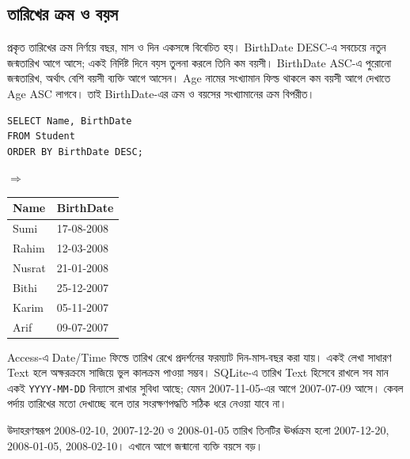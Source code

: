 \subsection{তারিখের ক্রম ও বয়স}
প্রকৃত তারিখের ক্রম নির্ণয়ে বছর, মাস ও দিন একসঙ্গে বিবেচিত হয়। BirthDate DESC-এ সবচেয়ে নতুন জন্মতারিখ আগে আসে; একই নির্দিষ্ট দিনে বয়স তুলনা করলে তিনি কম বয়সী। BirthDate ASC-এ পুরোনো জন্মতারিখ, অর্থাৎ বেশি বয়সী ব্যক্তি আগে আসেন। Age নামের সংখ্যামান ফিল্ড থাকলে কম বয়সী আগে দেখাতে Age ASC লাগবে। তাই BirthDate-এর ক্রম ও বয়সের সংখ্যামানের ক্রম বিপরীত।
\par\smallskip\noindent\begin{minipage}{\linewidth}
\begin{minipage}[c]{.54\linewidth}
\begin{verbatim}
SELECT Name, BirthDate
FROM Student
ORDER BY BirthDate DESC;
\end{verbatim}
\end{minipage}\hfill\begin{minipage}[c]{.04\linewidth}$\Rightarrow$\end{minipage}\hfill
\begin{minipage}[c]{.39\linewidth}\raggedright\small
\begin{tabular}{|l|l|}\hline
Name & BirthDate\\\hline
Sumi & 17-08-2008\\\hline Rahim & 12-03-2008\\\hline
Nusrat & 21-01-2008\\\hline Bithi & 25-12-2007\\\hline
Karim & 05-11-2007\\\hline Arif & 09-07-2007\\\hline
\end{tabular}
\end{minipage}
\end{minipage}\par\smallskip
Access-এ Date/Time ফিল্ডে তারিখ রেখে প্রদর্শনের ফরম্যাট দিন-মাস-বছর করা যায়। একই লেখা সাধারণ Text হলে অক্ষরক্রমে সাজিয়ে ভুল কালক্রম পাওয়া সম্ভব। SQLite-এ তারিখ Text হিসেবে রাখলে সব মান একই \texttt{YYYY-MM-DD} বিন্যাসে রাখার সুবিধা আছে; যেমন 2007-11-05-এর আগে 2007-07-09 আসে। কেবল পর্দায় তারিখের মতো দেখাচ্ছে বলে তার সংরক্ষণপদ্ধতি সঠিক ধরে নেওয়া যাবে না।

উদাহরণস্বরূপ 2008-02-10, 2007-12-20 ও 2008-01-05 তারিখ তিনটির ঊর্ধ্বক্রম হলো 2007-12-20, 2008-01-05, 2008-02-10। এখানে আগে জন্মানো ব্যক্তি বয়সে বড়।

